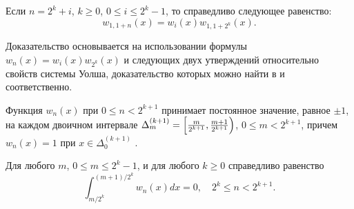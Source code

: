 \begin{theorem}\label{walsh-st-w1n-w12k}
	Если $n=2^k+i$, $k \ge 0$, $0 \le i \le 2^k-1$, то справедливо следующее равенство:
	\begin{equation*}
	w_{1,1+n}(x)=w_i(x)w_{1,1+2^k}(x).
	\end{equation*}
\end{theorem}
Доказательство основывается на использовании формулы $w_n(x)=w_i(x)w_{2^k}(x)$ \cite[с. 10, формула (1.1.5)]{walsh-GolubovBook} и следующих двух утверждений относительно свойств системы Уолша, доказательство которых можно найти в \cite[с. 11, теорема 1.1.3]{walsh-GolubovBook} и \cite[с. 11, теорема 1.1.4]{walsh-GolubovBook} соответственно.
\begin{statement}\label{walsh-w-const-on-delta}
	Функция $w_n(x)$ при $0 \le n < 2^{k+1}$ принимает постоянное значение, равное $\pm 1$, на каждом двоичном интервале
	$\Delta_m^{(k+1)}=\Bigl[\frac{m}{2^{k+1}},\frac{m+1}{2^{k+1}}\Bigr)$, $0 \le m < 2^{k+1}$, причем $w_n(x)=1$ при $x \in \Delta_0^{(k+1)}$ .
\end{statement}
\begin{statement}\label{walsh-int-deltak-zero}
	Для любого $m$, $0 \le m \le 2^k-1$, и для любого $k \ge 0$ справедливо равенство
	\begin{equation*}
	\int_{m/2^k}^{(m+1)/2^k}
	w_n(x)dx = 0, \quad 2^k \le n < 2^{k+1}.
	\end{equation*}
\end{statement}








